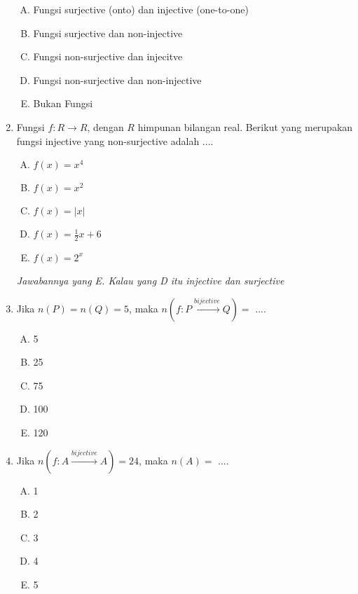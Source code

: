 \documentclass[fleqn, a4paper, 12pt]{article} %
\begin{document}
\begin{enumerate}
			\begin{enumerate}[(A)]
				\item Fungsi surjective (onto) dan injective (one-to-one)
				\item Fungsi surjective dan non-injective
				\item Fungsi non-surjective dan injecitve
				\item Fungsi non-surjective dan non-injective
				\item Bukan Fungsi
			\end{enumerate}		
		
		\newpage
		
		\item Fungsi $f: R \rightarrow R$, dengan $R$ himpunan bilangan real. Berikut yang merupakan fungsi injective yang non-surjective adalah ....
		\begin{enumerate}[(A)]
			\item $f(x) = x^4$
			\item $f(x) = x^2$
			\item $f(x) = |x|$
			\item $f(x) = \frac{1}{2}x + 6$
			\item $f(x) = 2^x$
		\end{enumerate}
		
		\textit{Jawabannya yang E. Kalau yang D itu injective dan surjective}
		
		\item Jika $n(P) = n(Q) = 5$, maka $n(f: P \xrightarrow{bijective} Q) = $ ....
		\begin{enumerate}[(A)]
			\item 5
			\item 25
			\item 75
			\item 100
			\item 120
		\end{enumerate}
		
		\item Jika $n(f: A \xrightarrow{bijective} A) = 24$, maka $n(A) = $ ....
		\begin{enumerate}[(A)]
			\item 1
			\item 2
			\item 3
			\item 4
			\item 5
		\end{enumerate}
		

\end{enumerate}
\end{document}
